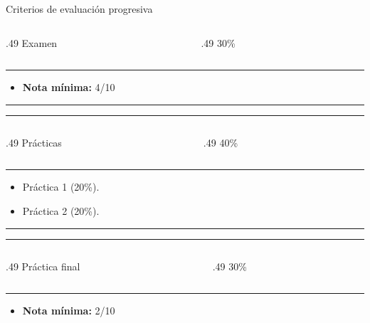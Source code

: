 \begin{frame}{Criterios de evaluación progresiva}
\begin{columns}[T]
\begin{column}{.49\textwidth}
Examen
\end{column}
\hfill
\begin{column}{.49\textwidth}
\centering
\alert{\Huge 30\%}
\end{column}
\end{columns}
\vfill
\hrule

\begin{itemize}
    \item \textbf{Nota mínima:} 4/10
\end{itemize}
\vfill
\hrule
\hrule

\vfill
\begin{columns}[T]
\begin{column}{.49\textwidth}
\vspace{0.2cm}
Prácticas
\end{column}
\hfill
\begin{column}{.49\textwidth}
\centering
\alert{\Huge 40\%}
\end{column}
\end{columns}
\vfill
\hrule

\begin{itemize}
    \item Práctica 1 (\alert{20\%}).
    \item Práctica 2 (\alert{20\%}).
\end{itemize}
\vfill

\hrule
\hrule

\vfill
\begin{columns}[T]
\begin{column}{.49\textwidth}
\vspace{0.2cm}
Práctica final
\end{column}
\begin{column}{.49\textwidth}
\centering
\alert{\Huge 30\%}
\end{column}
\end{columns}
\vfill
\hrule

\begin{itemize}
    \item \textbf{Nota mínima:} 2/10
\end{itemize}
\end{frame}

